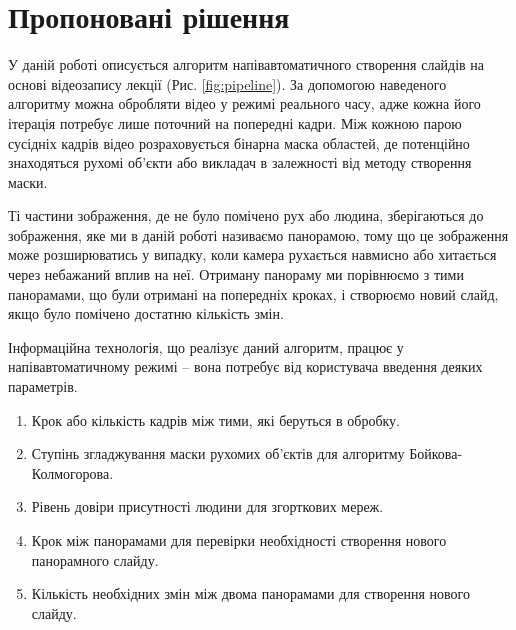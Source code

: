 \section{Пропоновані рішення}


У даній роботі описується алгоритм напівавтоматичного
створення слайдів на основі відеозапису лекції (Рис. \ref{fig:pipeline}).
За допомогою наведеного алгоритму можна обробляти відео
у режимі реального часу, адже кожна його ітерація потребує
лише поточний на попередні кадри. Між кожною парою
сусідніх кадрів відео розраховується бінарна маска областей, де
потенційно знаходяться рухомі об'єкти або викладач в залежності від методу
створення маски.

Ті частини зображення, де не було помічено рух або людина,
зберігаються до зображення, яке ми в даній роботі називаємо панорамою, тому що
це зображення може розширюватись у випадку, коли камера рухається
навмисно або хитається через небажаний вплив на неї.
Отриману панораму ми порівнюємо з тими панорамами, що були отримані на
попередніх кроках, і створюємо новий слайд, якщо було помічено
достатню кількість змін.

Інформаційна технологія, що реалізує даний алгоритм, працює у
напівавтоматичному режимі – вона потребує від користувача введення
деяких параметрів.
\begin{enumerate}
    \item Крок або кількість кадрів між тими, які беруться в обробку.
    \item Ступінь згладжування маски рухомих об'єктів для алгоритму Бойкова-Колмогорова.
    \item Рівень довіри присутності людини для згорткових мереж.
    \item Крок між панорамами для перевірки необхідності створення нового панорамного слайду.
    \item Кількість необхідних змін між двома панорамами для створення нового слайду.
\end{enumerate}


